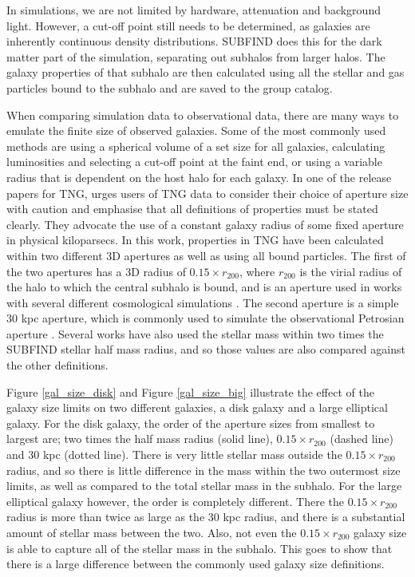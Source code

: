 In simulations, we are not limited by hardware, attenuation and background light. However, a cut-off point still needs to be determined, as galaxies are inherently continuous density distributions. SUBFIND does this for the dark matter part of the simulation, separating out subhalos from larger halos. The galaxy properties of that subhalo are then calculated using all the stellar and gas particles bound to the subhalo and are saved to the group catalog. 

When comparing simulation data to observational data, there are many ways to emulate the finite size of observed galaxies. Some of the most commonly used methods are using a spherical volume of a set size for all galaxies, calculating luminosities and selecting a cut-off point at the faint end, or using a variable radius that is dependent on the host halo for each galaxy. In one of the release papers for TNG, \textcite{Pillepich2017} urges users of TNG data to consider their choice of aperture size with caution and emphasise that all definitions of properties must be stated clearly. They advocate the use of a constant galaxy radius of some fixed aperture in physical kiloparsecs. In this work, properties in TNG have been calculated within two different 3D apertures as well as using all bound particles. The first of the two apertures has a 3D radius of $0.15 \times r_{200}$, where $r_{200}$ is the virial radius of the halo to which the central subhalo is bound, and is an aperture used in works with several different cosmological simulations \parencite{Ferrero2020}. The second aperture is a simple 30 kpc aperture, which is commonly used to simulate the observational Petrosian aperture \parencite{Schaye2015}. Several works have also used the stellar mass within two times the SUBFIND stellar half mass radius, and so those values are also compared against the other definitions.

Figure \ref{gal_size_disk} and Figure \ref{gal_size_big} illustrate the effect of the galaxy size limits on two different galaxies, a disk galaxy and a large elliptical galaxy. For the disk galaxy, the order of the aperture sizes from smallest to largest are; two times the half mass radius (solid line), $0.15 \times r_{200}$ (dashed line) and 30 kpc (dotted line). There is very little stellar mass outside the $0.15 \times r_{200}$ radius, and so there is little difference in the mass within the two outermost size limits, as well as compared to the total stellar mass in the subhalo. For the large elliptical galaxy however, the order is completely different. There the $0.15 \times r_{200}$ radius is more than twice as large as the 30 kpc radius, and there is a substantial amount of stellar mass between the two. Also, not even the $0.15 \times r_{200}$ galaxy size is able to capture all of the stellar mass in the subhalo. This goes to show that there is a large difference between the commonly used galaxy size definitions.


